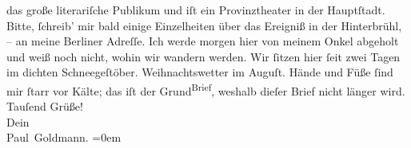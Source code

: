 \begin{ledgroupsized}[t]{13cm}
               das große literariſche Publikum und iſt ein Provinztheater in der \strikeout{\textcolor{gray}{H}}{ }Hauptſtadt. Bitte, ſchreib’ mir
               bald {\pb}einige Einzelheiten über das Ereigniß in der
                  Hinterbrühl, – an meine Berliner Adreſſe. Ich werde morgen{ }hier von meinem Onkel abgeholt und weiß noch
               nicht, wohin wir wandern werden. Wir ſitzen hier ſeit zwei Tagen im dichten Schneegeſtöber.
               Weihnachtswetter im Auguſt. Hände und Füße ſind mir ſtarr vor Kälte; das iſt der \introOben{}Grund\introOben{}{ }\substVorne{}\textsuperscript{Brief}\substDazwischen{}\substHinten{}, weshalb  dieſer Brief nicht länger
               wird.\pend
           \pstart
           {\pb}Tauſend Grüße! {\\[\baselineskip]}Dein {\\[\baselineskip]}\spacefill\mbox{Paul Goldmann.}\pend
           \leftskip=0em{}
         
         \endnumbering{}\end{ledgroupsized}  \newcommand{\dateiname}{L03219}\newcommand{\titel}{Paul Goldmann an Arthur Schnitzler, 12. 8. [1902]}\newcommand{\editorInnen}{Martin Anton Müller und Laura Untner}
      